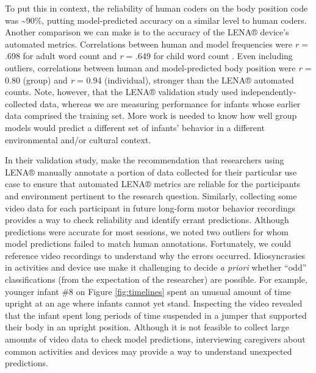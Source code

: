 \documentclass[
  man]{apa6}
\begin{document}
To put this in context, the reliability of human coders on the body position code was \textasciitilde90\%, putting model-predicted accuracy on a similar level to human coders. Another comparison we can make is to the accuracy of the LENA® device's automated metrics. Correlations between human and model frequencies were \emph{r} = .698 for adult word count and \emph{r} = .649 for child word count \autocite{CristiaLavechin2020}. Even including outliers, correlations between human and model-predicted body position were \emph{r} = 0.80 (group) and \emph{r} = 0.94 (individual), stronger than the LENA® automated counts. Note, however, that the LENA® validation study used independently-collected data, whereas we are measuring performance for infants whose earlier data comprised the training set. More work is needed to know how well group models would predict a different set of infants' behavior in a different environmental and/or cultural context.

In their validation study, \textcite{CristiaLavechin2020} make the recommendation that researchers using LENA® manually annotate a portion of data collected for their particular use case to ensure that automated LENA® metrics are reliable for the participants and environment pertinent to the research question. Similarly, collecting some video data for each participant in future long-form motor behavior recordings provides a way to check reliability and identify errant predictions. Although predictions were accurate for most sessions, we noted two outliers for whom model predictions failed to match human annotations. Fortunately, we could reference video recordings to understand why the errors occurred. Idiosyncrasies in activities and device use make it challenging to decide \emph{a priori} whether ``odd'' classifications (from the expectation of the researcher) are possible. For example, younger infant \#8 on Figure \ref{fig:timelines} spent an unusual amount of time upright at an age where infants cannot yet stand. Inspecting the video revealed that the infant spent long periods of time suspended in a jumper that supported their body in an upright position. Although it is not feasible to collect large amounts of video data to check model predictions, interviewing caregivers about common activities and devices may provide a way to understand unexpected predictions.
\end{document}
